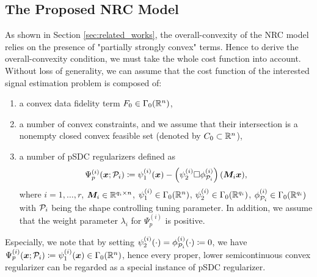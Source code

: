 \documentclass[lettersize,journal]{IEEEtran}
\theoremstyle{plain}%
\theoremstyle{definition}
\theoremstyle{remark}
\begin{document}
\subsection{The Proposed NRC Model}\label{subsec:NRC_model}
As shown in Section \ref{sec:related_works}, the overall-convexity of the NRC model relies on the presence of "partially strongly convex" terms. Hence to derive the overall-convexity condition, we must take the whole cost function into account. Without loss of generality, we can assume that the cost function of the interested signal estimation problem is composed of:
\begin{enumerate}
\item a convex data fidelity term  $F_0\in\Gamma_0(\mathbb{R}^n)$,
\item a number of convex constraints, and we assume that their intersection is a nonempty closed convex feasible set (denoted by $C_0\subset\mathbb{R}^n$),


\item a number of pSDC regularizers defined as
\begin{equation*}
\Psi_{p}^{(i)}(\bm{x};\mathcal{P}_i)\coloneqq \psi_{1}^{(i)}(\bm{x})-\left( \psi_{2}^{(i)}\Box\phi_{\mathcal{P}_i}^{(i)} \right )(\bm{M}_i\bm{x}),
\end{equation*}
where $i=1,\dots,r$, $\bm{M}_i\in\mathbb{R}^{q_i\times n}$, $\psi_{1}^{(i)}\in\Gamma_0(\mathbb{R}^n)$, $\psi_{2}^{(i)}\in\Gamma_0(\mathbb{R}^{q_i})$, $\phi^{(i)}_{\mathcal{P}_i}\in\Gamma_0(\mathbb{R}^{q_i})$
with $\mathcal{P}_{i}$ being the shape controlling tuning parameter. In addition, we assume that the weight parameter $\lambda_{i}$ for $\Psi_{p}^{(i)}$ is positive.
\end{enumerate}
Especially, we note that by setting $\psi_{2}^{(i)}(\cdot)=\phi^{(i)}_{\mathcal{P}_i}(\cdot)\coloneqq 0$, we have $\Psi_{p}^{(i)}(\bm{x};\mathcal{P}_i)\coloneqq \psi_1^{(i)}(\bm{x})\in\Gamma_0(\mathbb{R}^n)$, hence every proper, lower semicontinuous convex regularizer can be regarded as a special instance of pSDC regularizer.
\end{document}
